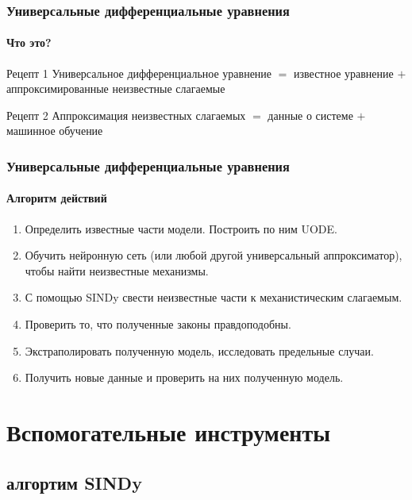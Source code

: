 \documentclass[10pt,pdf,hyperref={unicode}]{beamer}
\begin{document}
		\begin{frame}
			\frametitle{Универсальные дифференциальные уравнения} 
			\framesubtitle{Что это?}
			\begin{block}{Рецепт 1}
				Универсальное дифференциальное уравнение $=$ известное уравнение $+$ аппроксимированные неизвестные слагаемые
			\end{block}
			\pause
			\begin{block}{Рецепт 2}
				Аппроксимация неизвестных слагаемых $=$ данные о системе $+$ машинное обучение
			\end{block}
		
		\end{frame}
	
		\begin{frame}
			\frametitle{Универсальные дифференциальные уравнения} 
			\framesubtitle{Алгоритм действий}
					\begin{enumerate}
						\item<2-> Определить известные части модели. Построить по ним UODE.
						\item<3-> Обучить нейронную сеть (или любой другой универсальный аппроксиматор), чтобы найти неизвестные механизмы.
						\item<4-> С помощью SINDy свести неизвестные части к механистическим слагаемым.
						\item<5-> Проверить то, что полученные законы правдоподобны.
						\item<6-> Экстраполировать полученную модель, исследовать предельные случаи.
						\item<7-> Получить новые данные и проверить на них полученную модель.
					\end{enumerate}
		\end{frame}
	
	
	\section{Вспомогательные инструменты}
	
		\subsection{алгортим SINDy}
		
\end{document}
